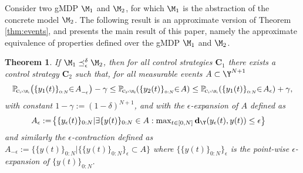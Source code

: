 \documentclass[letterpaper, 10 pt, conference]{amsart}
\newtheorem{theorem}{Theorem}
\theoremstyle{definition}
\theoremstyle{example}
\theoremstyle{remark}
\newcommand{\po}{\mathbb{P}}     \newcommand{\p}[1]{\po\left(#1\right)}     \newcommand{\pd}[1]{p\left(#1\right)}     \newcommand{\borel}[1]{\mathcal{B}\left(#1\right)}
\newcommand{\eps}{\epsilon}
\newcommand{\C}{{\mathbf{C}}}
\newcommand{\pcm}[2]{\po_{\scalebox{0.5}[.5]{$\!\!#1\!\!\times\!\!#2$}}}
\begin{document}
Consider two gMDP $\M_1$ and $\M_2$, 
for which $\M_1$ is the abstraction of the concrete model $\M_2$.  
The following result is an approximate version of Theorem \ref{thm:events},  
and presents the main result of this paper, 
namely the approximate equivalence of properties defined over the  gMDP $\M_1$ and $\M_2$.  

\begin{theorem}\label{thm:cr} 
If $\M_1\preceq_\eps^\delta \M_2$, 
then for all control strategies $ {\mathbf{C}_1}$ there exists a control strategy $\mathbf C_2$ such that, 
for all measurable events $A\subset \Y^{N+1 }$  
\begin{align*} \pcm{\C_1}{\M_1}\!\left(\{ y_1 (t)\}_{_{0:N}}\!\!\in\! A_{_{\scalebox{0.7}[.7]{\mbox{$-\eps$}}}}\right)-\gamma \leq \pcm{\C_2}{\M_2}\!\left(\{y_2 (t)\}_{_{0:N}}\!\!\in\! A\right)\leq\pcm{\C_1}{\M_1}\!\left(\{y_1 (t)\}_{_{0:N}}\!\!\in\! A_{\eps}\right)+\gamma, \end{align*} 
with constant $1-\gamma:=(1-\delta)^{N+1}$,  
and with the $\eps$-expansion of $A$ defined as
 \begin{align*}
 \textstyle&A_\eps:=\!\big\{\{y_\eps(t)\}_{0:N}| \exists \{y(t)\}_{0:N}\in A:  \textstyle\max_{{t\in [0,N]}}  \mathbf d_\Y(y_\eps(t),y(t))\leq \eps\big\}\end{align*}
and  similarly the $\eps$-contraction defined as 
 \(A_{-\eps}:= \{\{y(t)\}_{0:N}|\{\{y(t)\}_{0:N}\}_{\eps}\subset A \}\)
where $\{\{y(t)\}_{0:N}\}_{\eps} $ is the point-wise $\eps$-expansion of $\{y(t)\}_{0:N}$.
\end{theorem}
\end{document}
